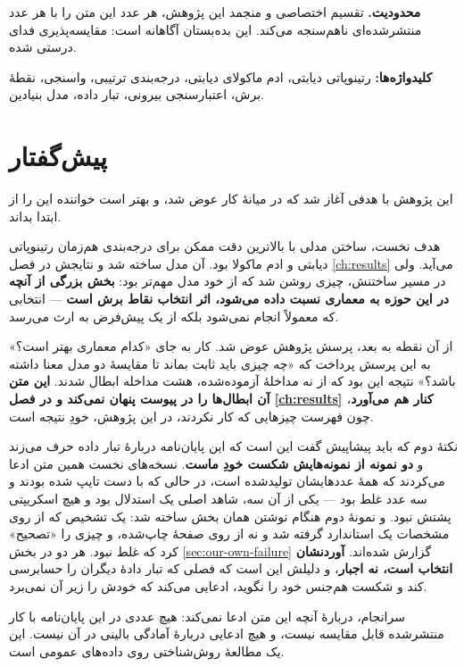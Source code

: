 \textbf{محدودیت.} تقسیم اختصاصی و منجمد این پژوهش، هر عدد این متن را با هر عدد منتشرشده‌ای
ناهم‌سنجه می‌کند. این بده‌بستان آگاهانه است: مقایسه‌پذیری فدای درستی شده.

\vspace{1em}
\noindent\textbf{کلیدواژه‌ها:} رتینوپاتی دیابتی، ادم ماکولای دیابتی، درجه‌بندی ترتیبی، واسنجی،
نقطهٔ برش، اعتبارسنجی بیرونی، تبار داده، مدل بنیادین.

\cleardoublepage

\chapter*{پیش‌گفتار}

این پژوهش با هدفی آغاز شد که در میانهٔ کار عوض شد، و بهتر است خواننده این را از ابتدا بداند.

هدف نخست، ساختن مدلی با بالاترین دقت ممکن برای درجه‌بندی هم‌زمان رتینوپاتی دیابتی و ادم ماکولا
بود. آن مدل ساخته شد و نتایجش در فصل \ref{ch:results} می‌آید. ولی در مسیر ساختنش، چیزی روشن شد
که از خود مدل مهم‌تر بود: \textbf{بخش بزرگی از آنچه در این حوزه به معماری نسبت داده می‌شود،
اثر انتخاب نقاط برش است} — انتخابی که معمولاً انجام نمی‌شود بلکه از یک پیش‌فرض به ارث می‌رسد.

از آن نقطه به بعد، پرسش پژوهش عوض شد. کار به جای «کدام معماری بهتر است؟» به این پرسش پرداخت
که «چه چیزی باید ثابت بماند تا مقایسهٔ دو مدل معنا داشته باشد؟» نتیجه این بود که از نه مداخلهٔ
آزموده‌شده، هشت مداخله ابطال شدند. \textbf{این متن آن ابطال‌ها را در پیوست پنهان نمی‌کند و در
فصل \ref{ch:results} کنار هم می‌آورد}، چون فهرست چیزهایی که کار نکردند، در این پژوهش، خودِ
نتیجه است.

نکتهٔ دوم که باید پیشاپیش گفت این است که این پایان‌نامه دربارهٔ تبار داده حرف می‌زند و
\textbf{دو نمونه از نمونه‌هایش شکست خودِ ماست}. نسخه‌های نخست همین متن ادعا می‌کردند که همهٔ
عددهایشان تولیدشده است، در حالی که با دست تایپ شده بودند و سه عدد غلط بود — یکی از آن سه، شاهد
اصلی یک استدلال بود و هیچ اسکریپتی پشتش نبود. و نمونهٔ دوم هنگام نوشتن همان بخش ساخته شد: یک
تشخیص که از روی مشخصات یک استاندارد گرفته شد و نه از روی صفحهٔ چاپ‌شده، و چیزی را «تصحیح» کرد
که غلط نبود. هر دو در بخش \ref{sec:our-own-failure} گزارش شده‌اند. \textbf{آوردنشان انتخاب
است، نه اجبار}، و دلیلش این است که فصلی که تبار دادهٔ دیگران را حسابرسی کند و شکست هم‌جنس خود
را نگوید، ادعایی می‌کند که خودش را زیر آن نمی‌برد.

سرانجام، دربارهٔ آنچه این متن ادعا نمی‌کند: هیچ عددی در این پایان‌نامه با کار منتشرشده قابل
مقایسه نیست، و هیچ ادعایی دربارهٔ آمادگی بالینی در آن نیست. این یک مطالعهٔ روش‌شناختی روی
داده‌های عمومی است.

